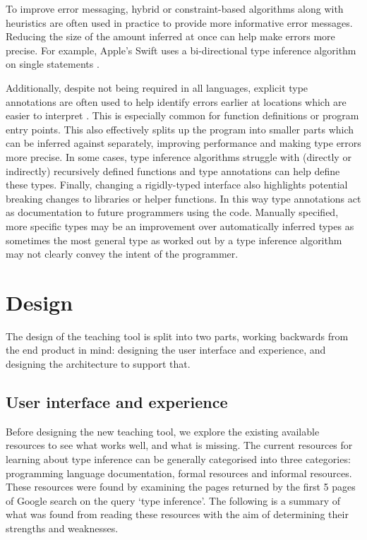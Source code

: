 \documentclass[a4paper,fleqn,oneside,12pt]{report}
\begin{document}
To improve error messaging, hybrid or constraint-based algorithms along with heuristics are often used in practice to provide more informative error messages. Reducing the size of the amount inferred at once can help make errors more precise. For example, Apple’s Swift uses a bi-directional type inference algorithm on single statements \citep{ref24}.

Additionally, despite not being required in all languages, explicit type annotations are often used to help identify errors earlier at locations which are easier to interpret \citep{ref35}. This is especially common for function definitions or program entry points. This also effectively splits up the program into smaller parts which can be inferred against separately, improving performance and making type errors more precise. In some cases, type inference algorithms struggle with (directly or indirectly) recursively defined functions and type annotations can help define these types. Finally, changing a rigidly-typed interface also highlights potential breaking changes to libraries or helper functions. In this way type annotations act as documentation to future programmers using the code. Manually specified, more specific types may be an improvement over automatically inferred types as sometimes the most general type as worked out by a type inference algorithm may not clearly convey the intent of the programmer.

\chapter{Design}\label{id:h.7ggvdxb04tzm}

The design of the teaching tool is split into two parts, working backwards from the end product in mind: designing the user interface and experience, and designing the architecture to support that.

\section{User interface and experience}\label{id:h.dr046u473e01}

Before designing the new teaching tool, we explore the existing available resources to see what works well, and what is missing. The current resources for learning about type inference can be generally categorised into three categories: programming language documentation, formal resources and informal resources. These resources were found by examining the pages returned by the first 5 pages of Google search on the query `type inference'. The following is a summary of what was found from reading these resources with the aim of determining their strengths and weaknesses.
\end{document}
